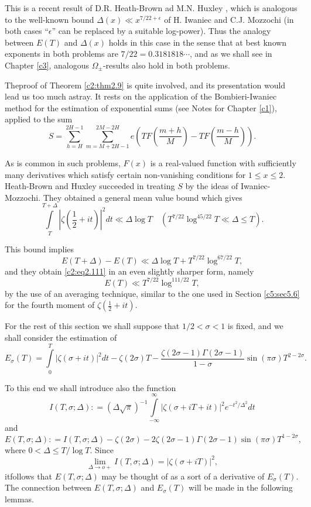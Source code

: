 This is a recent result of D.R. Heath-Brown ad M.N. Huxley \cite{Huxley1},
which is analogous to the well-known bound $\Delta  (x) \ll x^{7/22+
\epsilon}$ of H. Iwaniec and C.J. Mozzochi \cite{Iwaniec1} (in both cases 
``$\epsilon$'' can be replaced by a suitable log-power). Thus the
analogy between $E(T)$ and $\Delta  (x)$ holds in this case in the
sense that at best known exponents in both problems are $7/22=
0. 3181818 \cdots$, and as we shall see in Chapter \ref{c3}, analogous
$\Omega_{\pm}$-results also hold in both problems.

The\pageoriginale proof of Theorem \ref{c2:thm2.9} is quite involved,
and its presentation would lead us too much astray. It rests on the
application of the {\small Bombieri-Iwaniec} method for the estimation of
exponential sums (see Notes for Chapter \ref{c1}), applied to the sum
$$
S= \sum_{h=H}^{2H-1} \sum_{m=M+ 2H-1}^{2M-2H} e \left(TF
\left(\frac{m+h}{M}\right) - TF \left(\frac{m-h}{M} \right)\right).
$$

As is common in such problems, $F(x)$ is a real-valued function with
sufficiently many derivatives which satisfy certain non-vanishing
conditions for $1 \leq x \leq 2$. Heath-Brown and Huxley succeeded in
treating $S$ by the ideas of Iwaniec-Mozzochi. They obtained a general
mean value bound which gives
$$
\int\limits_T^{T+ \Delta } |\zeta (\frac{1}{2} + it)|^2 dt \ll \Delta 
\log T \quad (T^{7/22} \log ^{45/22} T\ll \Delta  \leq T).
$$ 
 
This bound implies
\begin{equation}
  E(T + \Delta ) - E(T) \ll \Delta  \log T+ T^{7/22}
  \log^{67/22}T,\label{c2:eq2.112}   
\end{equation}
and they obtain \eqref{c2:eq2.111} in an even slightly sharper form,
namely
$$
E(T) \ll T^{7/22} \log^{111/22}T,
$$
by the use of an averaging technique, similar to the one used in
Section \ref{c5:sec5.6} for the fourth moment of $\zeta (\frac{1}{2} + it)$.

For the rest of this section we shall suppose that $1/2 < \sigma < 1$
is fixed, and we shall consider the estimation of 
$$ 
E_\sigma (T) = \int\limits_0^T |\zeta (\sigma + it)|^2 dt - \zeta (2
\sigma)T - \frac{\zeta(2 \sigma -1)\Gamma (2 \sigma -1)}{1-\sigma}
\sin (\pi \sigma) T^{2-2\sigma}. 
$$

To this end we shall introduce also the function
\begin{equation}
  I (T, \sigma; \Delta ): = (\Delta  \sqrt{\pi})^{-1}
  \int\limits_{-\infty}^\infty | \zeta (\sigma + iT + it)|^2
  e^{-t^2/\Delta ^2}dt \label{c2:eq2.113}
 \end{equation}
and 
\begin{equation}
  E(T, \sigma ; \Delta ) : = I (T, \sigma; \Delta ) - \zeta (2
  \sigma) - 2 \zeta (2 \sigma-1) \Gamma (2 \sigma -1) \sin (\pi
  \sigma)T^{1-2 \sigma},\label{c2:eq2.114}
\end{equation}
where $0< \Delta  \leq T/\log T$. Since
$$
\lim\limits_{\Delta  \to o +} I (T, \sigma ; \Delta ) = |\zeta
(\sigma + iT)|^2,
$$
it\pageoriginale follows that $E(T, \sigma ; \Delta )$ may be thought of as a sort
of a derivative of $E_\sigma(T)$. The connection between $E(T, \sigma;
\Delta )$ and $E_\sigma(T)$ will be made in the following lemmas.

